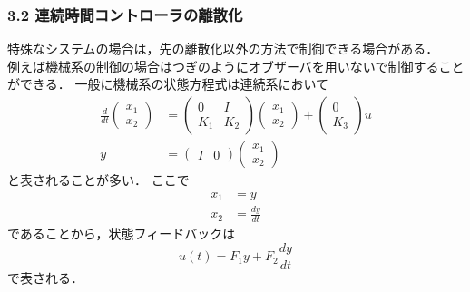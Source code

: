 \documentclass[10pt]{beamer}
\begin{document}
\begin{frame}[t]
\frametitle{3.2 連続時間コントローラの離散化}
特殊なシステムの場合は，先の離散化以外の方法で制御できる場合がある．\\
例えば機械系の制御の場合はつぎのようにオブザーバを用いないで制御することができる．
一般に機械系の状態方程式は連続系において
\begin{align}
 \frac{d}{dt}
  \left(\begin{array}{c}
         x_1 \\
	 x_2 
	\end{array}\right)
  &=
  \left(\begin{array}{cc}
         0   & I \\
	 K_1 & K_2
	\end{array}\right)
  \left(\begin{array}{c}
         x_1 \\
	 x_2 
	\end{array}\right)
  +
  \left(\begin{array}{c}
         0 \\
	 K_3
	\end{array}\right)
  u \\
 y &=
  \left(\begin{array}{cc}
         I & 0 
	\end{array}\right)
  \left(\begin{array}{c}
         x_1 \\
	 x_2 
	\end{array}\right)
\end{align}
と表されることが多い．
ここで
\begin{align}
 x_1 &= y \\
 x_2 &= \frac{dy}{dt}
\end{align}
であることから，状態フィードバックは
\begin{equation}
 u(t) = F_1 y + F_2 \frac{dy}{dt}
\end{equation}
で表される．
\end{frame}
\end{document}
